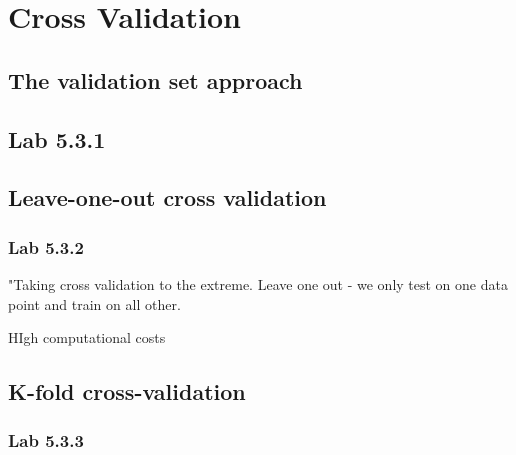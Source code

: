 \chapter{Cross Validation}
\label{chp:crossval}

\section{The validation set approach}

\section{Lab 5.3.1}

\section{Leave-one-out cross validation}

\subsection{Lab 5.3.2}
"Taking cross validation to the extreme. Leave one out - we only test on one data point and train on all other.

HIgh computational costs

\section{K-fold cross-validation}


\subsection{Lab 5.3.3}